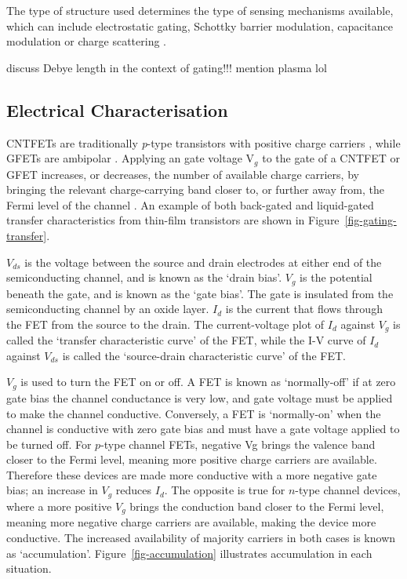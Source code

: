 \documentclass[
  a4paper,
]{scrbook}
\begin{document}
The type of structure used determines the type of sensing mechanisms
available, which can include electrostatic gating, Schottky barrier
modulation, capacitance modulation or charge scattering
\autocite{Heller2008}.

discuss Debye length in the context of gating!!! mention plasma lol

\hypertarget{electrical-characterisation}{%
\subsection{Electrical
Characterisation}\label{electrical-characterisation}}

CNTFETs are traditionally \emph{p}-type transistors with positive charge
carriers \autocite{Martel1998,Kong2000}, while GFETs are ambipolar
\autocite{Ohno2010a}. Applying an gate voltage V\(_g\) to the gate of a
CNTFET or GFET increases, or decreases, the number of available charge
carriers, by bringing the relevant charge-carrying band closer to, or
further away from, the Fermi level of the channel \autocite{Sze2006}. An
example of both back-gated and liquid-gated transfer characteristics
from thin-film transistors are shown in
Figure~\ref{fig-gating-transfer}.

\(V_{ds}\) is the voltage between the source and drain electrodes at
either end of the semiconducting channel, and is known as the `drain
bias'. \(V_g\) is the potential beneath the gate, and is known as the
`gate bias'. The gate is insulated from the semiconducting channel by an
oxide layer. \(I_d\) is the current that flows through the FET from the
source to the drain. The current-voltage plot of \(I_d\) against \(V_g\)
is called the `transfer characteristic curve' of the FET, while the I-V
curve of \(I_d\) against \(V_{ds}\) is called the `source-drain
characteristic curve' of the FET.

\(V_g\) is used to turn the FET on or off. A FET is known as
`normally-off' if at zero gate bias the channel conductance is very low,
and gate voltage must be applied to make the channel conductive.
Conversely, a FET is `normally-on' when the channel is conductive with
zero gate bias and must have a gate voltage applied to be turned off.
For \(p\)-type channel FETs, negative Vg brings the valence band closer
to the Fermi level, meaning more positive charge carriers are available.
Therefore these devices are made more conductive with a more negative
gate bias; an increase in \(V_g\) reduces \(I_d\). The opposite is true
for \(n\)-type channel devices, where a more positive \(V_g\) brings the
conduction band closer to the Fermi level, meaning more negative charge
carriers are available, making the device more conductive. The increased
availability of majority carriers in both cases is known as
`accumulation'. Figure~\ref{fig-accumulation} illustrates accumulation
in each situation.
\end{document}
